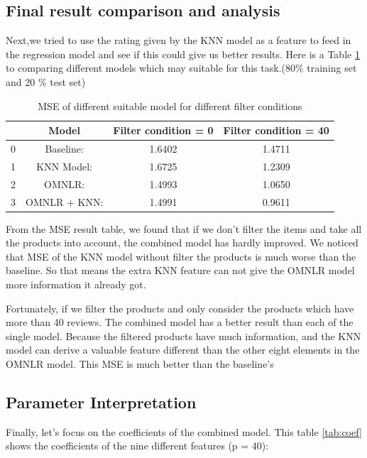 \documentclass[sigconf]{acmart}
\begin{document}
\subsection{Final result comparison and analysis}
Next,we tried to use the rating given by the KNN model as a feature to feed in the regression model and see if this could give us better results. Here is a Table \ref{tab:res} to comparing different models which may suitable for this task.(80\% training set and 20 \% test set)

\begin{table}[h]
  \centering
  \caption{MSE of different suitable model for different filter conditions}
  \label{tab:res}
  \begin{tabular}{c|c|c|c}
    \toprule
    & Model & Filter condition = 0 & Filter condition = 40 \\
    \midrule
    0 & Baseline: & 1.6402 & 1.4711\\
    1 & KNN Model: & 1.6725 & 1.2309\\
    2 & OMNLR: & 1.4993 & 1.0650\\
    3 & OMNLR + KNN: & 1.4991 & 0.9611\\
  \bottomrule
\end{tabular}
\end{table}

From the MSE result table, we found that if we don't filter the items and take all the products into account, the combined model has hardly improved. We noticed that MSE of the KNN model without filter the products is much worse than the baseline. So that means the extra KNN feature can not give the OMNLR model more information it already got.

Fortunately, if we filter the products and only consider the products which have more than 40 reviews. The combined model has a better result than each of the single model. Because the filtered products have much information, and the KNN model can derive a valuable feature different than the other eight elements in the OMNLR model. This MSE is much better than the baseline's

\subsection{Parameter Interpretation}
Finally, let's focus on the coefficients of the combined model. This table 
\ref{tab:coef} shows the coefficients of the nine different features (p = 40):
\end{document}
